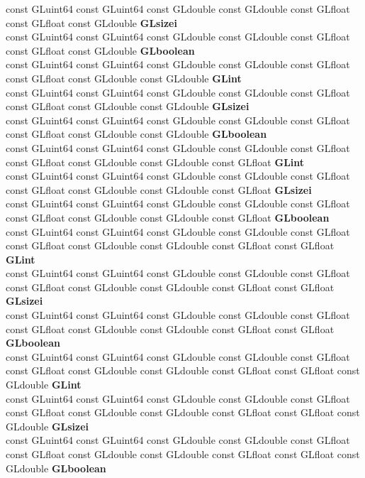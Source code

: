 \begin{DoxyCompactItemize}
\begin{tabbing}
\>const GLuint64 const GLuint64 const GLdouble const GLdouble const GLfloat const GLfloat const GLdouble {\bfseries GLsizei}\\
\>const GLuint64 const GLuint64 const GLdouble const GLdouble const GLfloat const GLfloat const GLdouble {\bfseries GLboolean}\\
\>const GLuint64 const GLuint64 const GLdouble const GLdouble const GLfloat const GLfloat const GLdouble const GLdouble {\bfseries GLint}\\
\>const GLuint64 const GLuint64 const GLdouble const GLdouble const GLfloat const GLfloat const GLdouble const GLdouble {\bfseries GLsizei}\\
\>const GLuint64 const GLuint64 const GLdouble const GLdouble const GLfloat const GLfloat const GLdouble const GLdouble {\bfseries GLboolean}\\
\>const GLuint64 const GLuint64 const GLdouble const GLdouble const GLfloat const GLfloat const GLdouble const GLdouble const GLfloat {\bfseries GLint}\\
\>const GLuint64 const GLuint64 const GLdouble const GLdouble const GLfloat const GLfloat const GLdouble const GLdouble const GLfloat {\bfseries GLsizei}\\
\>const GLuint64 const GLuint64 const GLdouble const GLdouble const GLfloat const GLfloat const GLdouble const GLdouble const GLfloat {\bfseries GLboolean}\\
\>const GLuint64 const GLuint64 const GLdouble const GLdouble const GLfloat const GLfloat const GLdouble const GLdouble const GLfloat const GLfloat {\bfseries GLint}\\
\>const GLuint64 const GLuint64 const GLdouble const GLdouble const GLfloat const GLfloat const GLdouble const GLdouble const GLfloat const GLfloat {\bfseries GLsizei}\\
\>const GLuint64 const GLuint64 const GLdouble const GLdouble const GLfloat const GLfloat const GLdouble const GLdouble const GLfloat const GLfloat {\bfseries GLboolean}\\
\>const GLuint64 const GLuint64 const GLdouble const GLdouble const GLfloat const GLfloat const GLdouble const GLdouble const GLfloat const GLfloat const GLdouble {\bfseries GLint}\\
\>const GLuint64 const GLuint64 const GLdouble const GLdouble const GLfloat const GLfloat const GLdouble const GLdouble const GLfloat const GLfloat const GLdouble {\bfseries GLsizei}\\
\>const GLuint64 const GLuint64 const GLdouble const GLdouble const GLfloat const GLfloat const GLdouble const GLdouble const GLfloat const GLfloat const GLdouble {\bfseries GLboolean}\\

\end{tabbing}
\end{DoxyCompactItemize}
